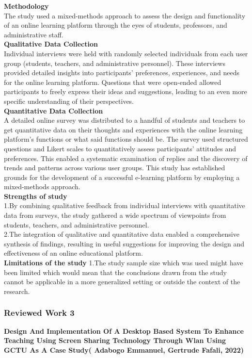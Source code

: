 \documentclass[a4paper,12pt]{article}  %
\begin{document}
\textbf{Methodology}\\
The study used a mixed-methods approach to assess the design and functionality of an online learning platform through the eyes of students, professors, and administrative staff.\\

\textbf{Qualitative Data Collection}\\
Individual interviews were held with randomly selected individuals from each user group (students, teachers, and administrative personnel). These interviews provided detailed insights into participants' preferences, experiences, and needs for the online learning platform. Questions that were open-ended allowed participants to freely express their ideas and suggestions, leading to an even more specific understanding of their perspectives.\\

\textbf{Quantitative Data Collection}\\
A detailed online survey was distributed to a handful of students and teachers to get quantitative data on their thoughts and experiences with the online learning platform's functions or what said functions should be. The survey used structured questions and Likert scales to quantitatively assess participants' attitudes and preferences. This enabled a systematic examination of replies and the discovery of trends and patterns across various user groups. This study has established grounds for the development of a successful e-learning platform by employing a mixed-methods approach.\\

\textbf{Strengths of study}\\
1.By combining qualitative feedback from individual interviews with quantitative data from surveys, the study gathered a wide spectrum of viewpoints from students, teachers, and administrative personnel. \\
2.The integration of qualitative and quantitative data enabled a comprehensive synthesis of findings, resulting in useful suggestions for improving the design and effectiveness of an online educational platform.\\

\textbf{Limitations of the study}
1.The study sample size which was used might have been limited which would mean that the conclusions drawn from the study cannot be applicable in a more generalized setting or outside the context of the research.

\subsubsection{ Reviewed Work 3}
\large\textbf{Design And Implementation Of A Desktop Based System To Enhance Teaching Using Screen Sharing Technology Through Wlan Using GCTU As A Case Study( Adabogo Emmanuel,  Gertrude Fafali, 2022)}\\
\end{document}

